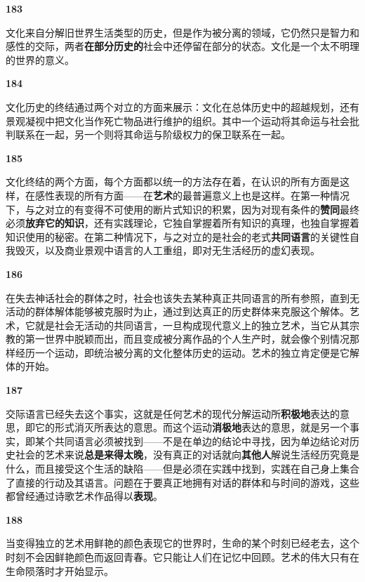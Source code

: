 \documentclass[fontset=fandol, a4paper, 12pt, openright]{ctexbook}
\makeatletter
\newcommand{\thesis}[1]{%
    \par\vspace{1.5em}%
    {\centering \textbf{\Large #1}\par}%
    \nobreak\vspace{0.5em}\nobreak
    \@afterindenttrue %
    \@afterheading    %
}
\makeatother
\begin{document}
\thesis{183}
文化来自分解旧世界生活类型的历史，但是作为被分离的领域，它仍然只是智力和感性的交际，两者\textbf{在部分历史的}社会中还停留在部分的状态。文化是一个太不明理的世界的意义。

\thesis{184}
文化历史的终结通过两个对立的方面来展示：文化在总体历史中的超越规划，还有景观凝视中把文化当作死亡物品进行维护的组织。其中一个运动将其命运与社会批判联系在一起，另一个则将其命运与阶级权力的保卫联系在一起。

\thesis{185}
文化终结的两个方面，每个方面都以统一的方法存在着，在认识的所有方面是这样，在感性表现的所有方面——在\textbf{艺术}的最普遍意义上也是这样。在第一种情况下，与之对立的有变得不可使用的断片式知识的积累，因为对现有条件的\textbf{赞同}最终必须\textbf{放弃它的知识}，还有实践理论，它独自掌握着所有知识的真理，也独自掌握着知识使用的秘密。在第二种情况下，与之对立的是社会的老式\textbf{共同语言}的关键性自我毁灭，以及商业景观中语言的人工重组，即对无生活经历的虚幻表现。

\thesis{186}
在失去神话社会的群体之时，社会也该失去某种真正共同语言的所有参照，直到无活动的群体解体能够被克服时为止，通过到达真正的历史群体来克服这个解体。艺术，它就是社会无活动的共同语言，一旦构成现代意义上的独立艺术，当它从其宗教的第一世界中脱颖而出，而且变成被分离作品的个人生产时，就会像个别情况那样经历一个运动，即统治被分离的文化整体历史的运动。艺术的独立肯定便是它解体的开始。

\thesis{187}
交际语言已经失去这个事实，这就是任何艺术的现代分解运动所\textbf{积极地}表达的意思，即它的形式消灭所表达的意思。而这个运动\textbf{消极地}表达的意思，就是另一个事实，即某个共同语言必须被找到——不是在单边的结论中寻找，因为单边结论对历史社会的艺术来说\textbf{总是来得太晚}，没有真正的对话就向\textbf{其他人}解说生活经历究竟是什么，而且接受这个生活的缺陷——但是必须在实践中找到，实践在自己身上集合了直接的行动及其语言。问题在于要真正地拥有对话的群体和与时间的游戏，这些都曾经通过诗歌艺术作品得以\textbf{表现}。

\thesis{188}
当变得独立的艺术用鲜艳的颜色表现它的世界时，生命的某个时刻已经老去，这个时刻不会因鲜艳颜色而返回青春。它只能让人们在记忆中回顾。艺术的伟大只有在生命陨落时才开始显示。
\end{document}

